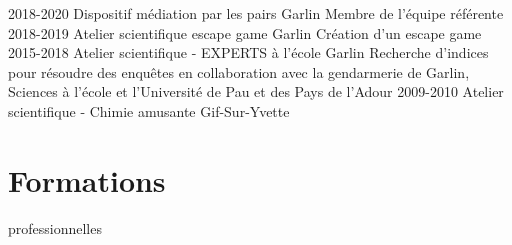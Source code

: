 \documentclass{../cv-style}     %
\begin{document}
\begin{entrylist}
\entry
{2018-2020}
{Dispositif médiation par les pairs}
{Garlin}
{Membre de l'équipe référente}
\entry
{2018-2019}
{Atelier scientifique escape game}
{Garlin}
{Création d'un escape game}
\entry
{2015-2018}
{Atelier scientifique - EXPERTS à l'école}
{Garlin}
{Recherche d'indices pour résoudre des enquêtes en collaboration avec la gendarmerie de Garlin, Sciences à l'école et l'Université de Pau et des Pays de l'Adour}
\entry
{2009-2010}
{Atelier scientifique - Chimie amusante}
{Gif-Sur-Yvette}
{}
\end{entrylist}

\vspace{-3ex}
\section{Formations}{ professionnelles}
\vspace{-1ex}
\end{document}
